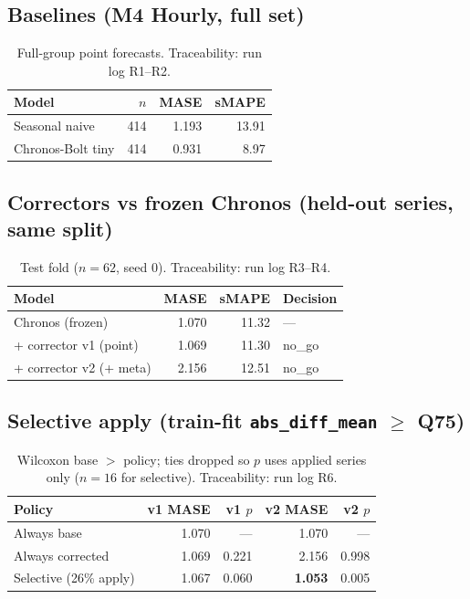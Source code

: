 
\subsection*{Baselines (M4 Hourly, full set)}
\begin{table}[ht]
\centering
\small
\begin{tabular}{lrrr}
\toprule
Model & $n$ & MASE & sMAPE \\
\midrule
Seasonal naive & 414 & 1.193 & 13.91 \\
Chronos-Bolt tiny & 414 & 0.931 & 8.97 \\
\bottomrule
\end{tabular}
\caption{Full-group point forecasts. Traceability: run log R1--R2.}
\end{table}

\subsection*{Correctors vs frozen Chronos (held-out series, same split)}
\begin{table}[ht]
\centering
\small
\begin{tabular}{lrrl}
\toprule
Model & MASE & sMAPE & Decision \\
\midrule
Chronos (frozen) & 1.070 & 11.32 & --- \\
+ corrector v1 (point) & 1.069 & 11.30 & no\_go \\
+ corrector v2 (+ meta) & 2.156 & 12.51 & no\_go \\
\bottomrule
\end{tabular}
\caption{Test fold ($n=62$, seed 0). Traceability: run log R3--R4.}
\end{table}

\subsection*{Selective apply (train-fit \texttt{abs\_diff\_mean} $\ge$ Q75)}
\begin{table}[ht]
\centering
\small
\begin{tabular}{lrrrr}
\toprule
Policy & v1 MASE & v1 $p$ & v2 MASE & v2 $p$ \\
\midrule
Always base & 1.070 & --- & 1.070 & --- \\
Always corrected & 1.069 & 0.221 & 2.156 & 0.998 \\
Selective (26\% apply) & 1.067 & 0.060 & \textbf{1.053} & 0.005 \\
\bottomrule
\end{tabular}
\caption{Wilcoxon base $>$ policy; ties dropped so $p$ uses applied series only
($n=16$ for selective). Traceability: run log R6.}
\end{table}

